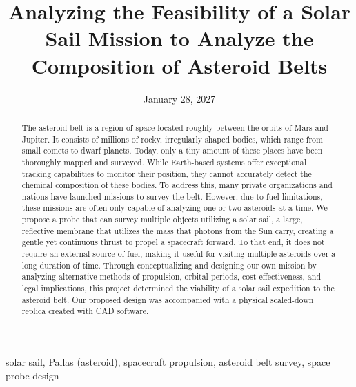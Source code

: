 \documentclass[12pt,conference,onecolumn]{IEEEtran}
\title{Analyzing the Feasibility of a Solar Sail Mission to Analyze the Composition of Asteroid Belts }
\author{%
\IEEEauthorblockN{Alex Liddawi}\IEEEauthorblockA{Science \& Engineering\\Manalapan High School\\Englishtown, NJ\\\href{mailto:427mreznik@frhsd.com}{427mreznik@frhsd.com}}\and
\IEEEauthorblockN{Tarun Ramesh}\IEEEauthorblockA{Science \& Engineering\\Manalapan High School\\Englishtown, NJ\\\href{mailto:427ssanrkitya@frhsd.com}{427ssankritya@frhsd.com}}
}
\date{January 28, 2027}
\newcommand{\keywords}{solar sail, Pallas (asteroid), spacecraft propulsion, asteroid belt survey, space probe design}
\begin{document}
\maketitle 

\begin{abstract}
The asteroid belt is a region of space located roughly between the orbits of Mars and Jupiter. It consists of millions of rocky, irregularly shaped bodies, which range from small comets to dwarf planets. Today, only a tiny amount of these places have been thoroughly mapped and surveyed. While Earth-based systems offer exceptional tracking capabilities to monitor their position, they cannot accurately detect the chemical composition of these bodies. To address this, many private organizations and nations have launched missions to survey the belt. However, due to fuel limitations, these missions are often only capable of analyzing one or two asteroids at a time. We propose a probe that can survey multiple objects utilizing a solar sail, a large, reflective membrane that utilizes the mass that photons from the Sun carry, creating a gentle yet continuous thrust to propel a spacecraft forward. To that end, it does not require an external source of fuel, making it useful for visiting multiple asteroids over a long duration of time.
Through conceptualizing and designing our own mission by analyzing alternative methods of propulsion, orbital periods, cost-effectiveness, and legal implications, this project determined the viability of a solar sail expedition to the asteroid belt. Our proposed design was accompanied with a physical scaled-down replica created with CAD software. 
\end{abstract}

\begin{IEEEkeywords}
\keywords
\end{IEEEkeywords}
\end{document}
